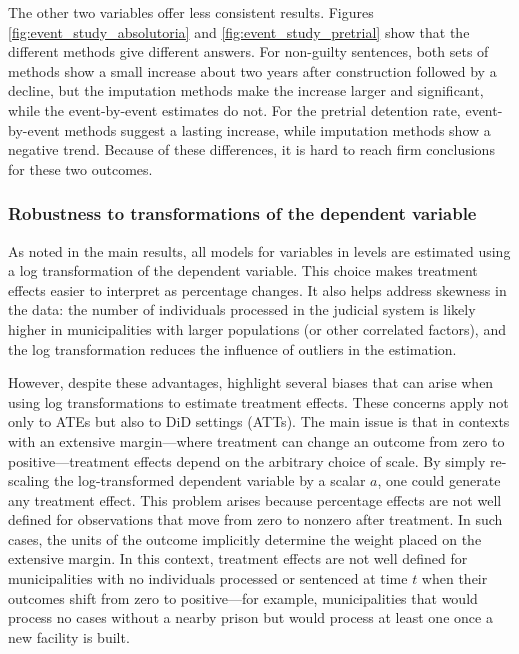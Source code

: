 The other two variables offer less consistent results. Figures \ref{fig:event_study_absolutoria} and \ref{fig:event_study_pretrial} show that the different methods give different answers. For non-guilty sentences, both sets of methods show a small increase about two years after construction followed by a decline, but the imputation methods make the increase larger and significant, while the event-by-event estimates do not. For the pretrial detention rate, event-by-event methods suggest a lasting increase, while imputation methods show a negative trend. Because of these differences, it is hard to reach firm conclusions for these two outcomes. 

\subsubsection*{Robustness to transformations of the dependent variable}
\label{sec:robust_log}
As noted in the main results, all models for variables in levels are estimated using a log transformation of the dependent variable. This choice makes treatment effects easier to interpret as percentage changes. It also helps address skewness in the data: the number of individuals processed in the judicial system is likely higher in municipalities with larger populations (or other correlated factors), and the log transformation reduces the influence of outliers in the estimation.

However, despite these advantages, \cite{ChenRoth2024} highlight several biases that can arise when using log transformations to estimate treatment effects. These concerns apply not only to ATEs but also to DiD settings (ATTs). The main issue is that in contexts with an extensive margin—where treatment can change an outcome from zero to positive—treatment effects depend on the arbitrary choice of scale. By simply re-scaling the log-transformed dependent variable by a scalar $a$, one could generate any treatment effect. This problem arises because percentage effects are not well defined for observations that move from zero to nonzero after treatment. In such cases, the units of the outcome implicitly determine the weight placed on the extensive margin. In this context, treatment effects are not well defined for municipalities with no individuals processed or sentenced at time $t$ when their outcomes shift from zero to positive—for example, municipalities that would process no cases without a nearby prison but would process at least one once a new facility is built.

